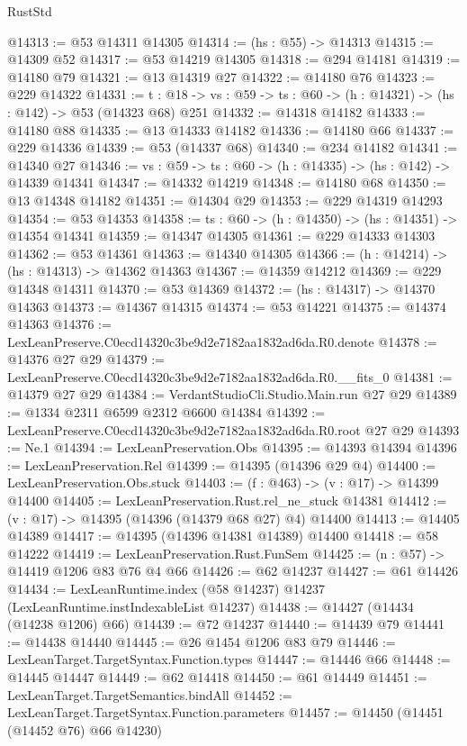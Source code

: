 \begin{lexlean}{RustStd}
\begin{coremodule}
@14313 := @53 @14311 @14305
@14314 := (hs : @55) -> @14313
@14315 := @14309 @52
@14317 := @53 @14219 @14305
@14318 := @294 @14181
@14319 := @14180 @79
@14321 := @13 @14319 @27
@14322 := @14180 @76
@14323 := @229 @14322
@14331 := {t : @18} ->
  {vs : @59} -> {ts : @60} -> (h : @14321) -> (hs : @142) -> @53 (@14323 @68) @251
@14332 := @14318 @14182
@14333 := @14180 @88
@14335 := @13 @14333 @14182
@14336 := @14180 @66
@14337 := @229 @14336
@14339 := @53 (@14337 @68)
@14340 := @234 @14182
@14341 := @14340 @27
@14346 := {vs : @59} -> {ts : @60} -> (h : @14335) -> (hs : @142) -> @14339 @14341
@14347 := @14332 @14219
@14348 := @14180 @68
@14350 := @13 @14348 @14182
@14351 := @14304 @29
@14353 := @229 @14319 @14293
@14354 := @53 @14353
@14358 := {ts : @60} -> (h : @14350) -> (hs : @14351) -> @14354 @14341
@14359 := @14347 @14305
@14361 := @229 @14333 @14303
@14362 := @53 @14361
@14363 := @14340 @14305
@14366 := (h : @14214) -> (hs : @14313) -> @14362 @14363
@14367 := @14359 @14212
@14369 := @229 @14348 @14311
@14370 := @53 @14369
@14372 := (hs : @14317) -> @14370 @14363
@14373 := @14367 @14315
@14374 := @53 @14221
@14375 := @14374 @14363
@14376 := LexLeanPreserve.C0ecd14320c3be9d2e7182aa1832ad6da.R0.denote
@14378 := @14376 @27 @29
@14379 := LexLeanPreserve.C0ecd14320c3be9d2e7182aa1832ad6da.R0.__fits_0
@14381 := @14379 @27 @29
@14384 := VerdantStudioCli.Studio.Main.run @27 @29
@14389 := @1334 @2311 @6599 @2312 @6600 @14384
@14392 := LexLeanPreserve.C0ecd14320c3be9d2e7182aa1832ad6da.R0.root @27 @29
@14393 := Ne.{1}
@14394 := LexLeanPreservation.Obs
@14395 := @14393 @14394
@14396 := LexLeanPreservation.Rel
@14399 := @14395 (@14396 @29 @4)
@14400 := LexLeanPreservation.Obs.stuck
@14403 := (f : @463) -> (v : @17) -> @14399 @14400
@14405 := LexLeanPreservation.Rust.rel_ne_stuck @14381
@14412 := (v : @17) -> @14395 (@14396 (@14379 @68 @27) @4) @14400
@14413 := @14405 @14389
@14417 := @14395 (@14396 @14381 @14389) @14400
@14418 := @58 @14222
@14419 := LexLeanPreservation.Rust.FunSem
@14425 := (n : @57) -> @14419 @1206 @83 @76 @4 @66
@14426 := @62 @14237
@14427 := @61 @14426
@14434 := LexLeanRuntime.index (@58 @14237) @14237 (LexLeanRuntime.instIndexableList @14237)
@14438 := @14427 (@14434 (@14238 @1206) @66)
@14439 := @72 @14237
@14440 := @14439 @79
@14441 := @14438 @14440
@14445 := @26 @1454 @1206 @83 @79
@14446 := LexLeanTarget.TargetSyntax.Function.types
@14447 := @14446 @66
@14448 := @14445 @14447
@14449 := @62 @14418
@14450 := @61 @14449
@14451 := LexLeanTarget.TargetSemantics.bindAll
@14452 := LexLeanTarget.TargetSyntax.Function.parameters
@14457 := @14450 (@14451 (@14452 @76) @66 @14230)

\end{coremodule}
\end{lexlean}
